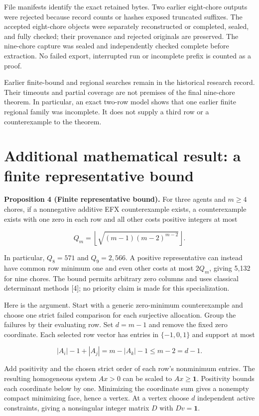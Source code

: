 \documentclass[
  11pt,
]{article}
\newcounter{none} %
\begin{document}
File manifests identify the exact retained bytes. Two earlier
eight-chore outputs were rejected because record counts or hashes
exposed truncated suffixes. The accepted eight-chore objects were
separately reconstructed or completed, sealed, and fully checked; their
provenance and rejected originals are preserved. The nine-chore capture
was sealed and independently checked complete before extraction. No
failed export, interrupted run or incomplete prefix is counted as a
proof.

Earlier finite-bound and regional searches remain in the historical
research record. Their timeouts and partial coverage are not premises of
the final nine-chore theorem. In particular, an exact two-row model
shows that one earlier finite regional family was incomplete. It does
not supply a third row or a counterexample to the theorem.

\section{Additional mathematical result: a finite representative
bound}\label{additional-mathematical-result-a-finite-representative-bound}

\textbf{Proposition 4 (Finite representative bound).} For three agents
and \(m\ge4\) chores, if a nonnegative additive EFX counterexample
exists, a counterexample exists with one zero in each row and all other
costs positive integers at most

\[
Q_m=\left\lfloor\sqrt{(m-1)(m-2)^{m-2}}\right\rfloor.
\]

In particular, \(Q_8=571\) and \(Q_9=2,566\). A positive representative
can instead have common row minimum one and even other costs at most
\(2Q_m\), giving 5,132 for nine chores. The bound permits arbitrary zero
columns and uses classical determinant methods {[}4{]}; no priority
claim is made for this specialization.

Here is the argument. Start with a generic zero-minimum counterexample
and choose one strict failed comparison for each surjective allocation.
Group the failures by their evaluating row. Set \(d=m-1\) and remove the
fixed zero coordinate. Each selected row vector has entries in
\(\{-1,0,1\}\) and support at most

\[
|A_i|-1+|A_j|=m-|A_k|-1\le m-2=d-1.
\]

Add positivity and the chosen strict order of each row's nonminimum
entries. The resulting homogeneous system \(Ax>0\) can be scaled to
\(Ax\ge\mathbf1\). Positivity bounds each coordinate below by one.
Minimizing the coordinate sum gives a nonempty compact minimizing face,
hence a vertex. At a vertex choose \(d\) independent active constraints,
giving a nonsingular integer matrix \(D\) with \(Dv=\mathbf1\).
\end{document}
